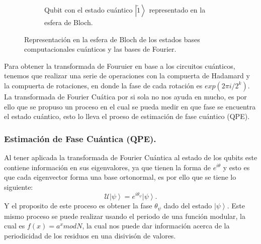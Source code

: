 \begin{figure}[H]
\begin{subfigure}{0.5\linewidth}
        \caption{Qubit con el estado cuántico $\left|\tilde{1} \right\rangle$ representado en la esfera de Bloch.}
    \end{subfigure}
\caption{Representación en la esfera de Bloch de los estados bases computacionales cuánticos y las bases de Fourier.}
\label{fig:QFT_bloch}
\end{figure}
Para obtener la transformada de Fouruier en base a los circuitos cuánticos, tenemos que realizar una serie de operaciones con la compuerta de Hadamard y la compuerta de rotaciones, en donde la 
fase de cada rotación es $exp(2\pi i / 2^k)$. La transformada de Fourier Cuática por si sola no nos ayuda en mucho, es por ello que se propuso un proceso en el cual
se pueda medir en que fase se encuentra el estado cuántico, esto lo lleva el proeso de estimación de fase cuántico (QPE).
\subsubsection{Estimación de Fase Cuántica (QPE).}

Al tener aplicada la transformada de Fourier Cuántica al estado de los qubits este contiene información en sus eigenvalores, ya que tienen la forma de
$e^{i\theta}$ y esto es que cada eigenvector forma una base ortonormal, es por ello que se tiene lo siguiente:
\begin{equation*}
    \mathcal{U} \left|\psi \right\rangle = e^{i\theta_\psi}\left|\psi \right\rangle.
\end{equation*}
Y el proposito de este proceso es obtener la fase $\theta_\psi$ dado del estado $\left|\psi \right\rangle$. Este mismo proceso se puede realizar usando 
el periodo de una función modular, la cual es $f(x)=a^xmodN$, la cual nos puede dar información acerca de la periodicidad de los residuos en una disivisón de valores.
